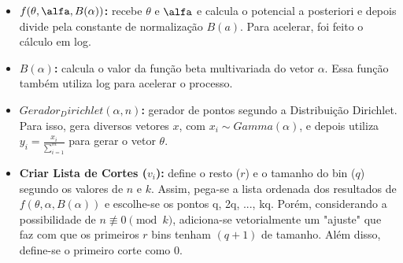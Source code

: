 \documentclass{article}
\begin{document}
\begin{itemize}
    \item \textbf{$f(\theta, \alfa, B(\alpha))$:} recebe $\theta$ e $\alfa$ e calcula o potencial a posteriori e depois divide pela constante de normalização $B(a)$. Para acelerar, foi feito o cálculo em log.
    \item \textbf{$B(\alpha)$:} calcula o valor da função beta multivariada do vetor $\alpha$. Essa função também utiliza log para acelerar o processo.
    \item \textbf{$Gerador_Dirichlet(\alpha, n)$:} gerador de pontos segundo a Distribuição Dirichlet. Para isso, gera diversos vetores \textbf{$x$}, com $x_i \sim Gamma(\alpha)$, e depois utiliza $y_i = \frac{x_i}{\sum_{i=1}^{m}}$ para gerar o vetor $\theta$.
    \item \textbf{Criar Lista de Cortes ($v_i$):} define o resto ($r$) e o tamanho do bin ($q$) segundo os valores de $n$ e $k$. Assim, pega-se a lista ordenada dos resultados de $f(\theta, \alpha, B(\alpha))$ e escolhe-se os pontos q, 2q, ..., kq. Porém, considerando a possibilidade de $n \not\equiv 0 \pmod{k}$, adiciona-se vetorialmente um "ajuste" que faz com que os primeiros $r$ bins tenham $(q+1)$ de tamanho. Além disso, define-se o primeiro corte como $0$.
\end{itemize}
\end{document}
